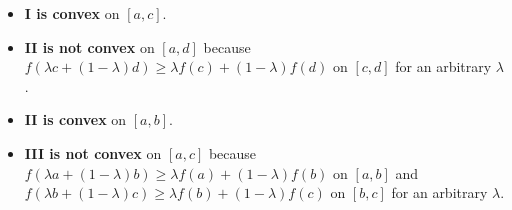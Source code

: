 \begin{itemize}
    \item {\bf I is convex} on $[a, c]$.
    \item {\bf II is not convex} on $[a, d]$ because $f(\lambda c + (1 - \lambda) d) \geq \lambda f(c) + (1 - \lambda) f(d)$ on $[c, d]$ for an arbitrary $\lambda$.
    \item {\bf II is convex} on $[a, b]$.
    \item {\bf III is not convex} on $[a, c]$ because $f(\lambda a + (1 - \lambda) b) \geq \lambda f(a) + (1 - \lambda) f(b)$ on $[a, b]$ and $f(\lambda b + (1 - \lambda) c) \geq \lambda f(b) + (1 - \lambda) f(c)$ on $[b, c]$ for an arbitrary $\lambda$.
\end{itemize}
